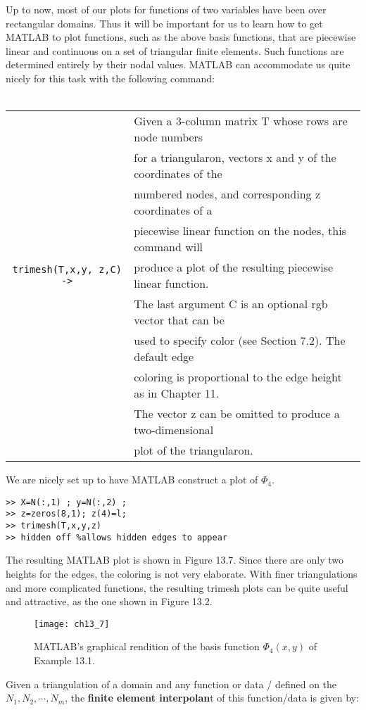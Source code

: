 \documentclass[../main.tex]{subfiles}
\begin{document}
Up to now, most of our plots for functions of two variables have been over rectangular domains. Thus it will be important for us to learn how to get MATLAB to plot functions, such as the above basis functions, that are piecewise linear and continuous on a set of triangular finite elements. Such functions are determined entirely by their nodal values. MATLAB can accommodate us quite nicely for this task with the following command: 
\\
\\
\begin{center}
\begin{tabular}{|c|l|}
\hline
 
&Given a 3-column matrix T whose rows are node numbers\\ 
&for a triangularon, vectors x and y of the coordinates of the \\
&numbered nodes, and corresponding z coordinates of a \\
&piecewise linear function on the nodes, this command will \\
  \texttt{trimesh(T,x,y, z,C) ->}&produce a plot of the resulting piecewise linear function.\\ 
&The last argument C is an optional rgb vector that can be \\
&used to specify color (see Section 7.2). The default edge \\
&coloring is proportional to the edge height as in Chapter 11. \\
&The vector z can be omitted to produce a two-dimensional \\
&plot of the triangularon.\\
\hline
\end{tabular}
\end{center}
We are nicely set up to have MATLAB construct a plot of $\Phi_4$.

\begin{lstlisting}[numbers=none,frame=none]
>> X=N(:,1) ; y=N(:,2) ; 
>> z=zeros(8,1); z(4)=l; 
>> trimesh(T,x,y,z) 
>> hidden off %allows hidden edges to appear
\end{lstlisting}

The resulting MATLAB plot is shown in Figure 13.7. Since there are only two 
heights for the edges, the coloring is not very elaborate. With finer triangulations and more complicated functions, the resulting trimesh plots can be quite useful and attractive, as the one shown in Figure 13.2. 

\begin{figure}[H]
	\centering
	\texttt{[image: ch13\_7]}
	\caption{\textsf{MATLAB's graphical rendition of the basis function $\Phi_4(x,y)$ of Example 13.1. }}
	\label{pfig:ch13_7}
\end{figure}
Given a triangulation of a domain and any function or data / defined on the 
 $N_1, N_2, \cdots, N_m$, the \textbf{finite element interpolan}t of this function/data is given by: 
\end{document}
